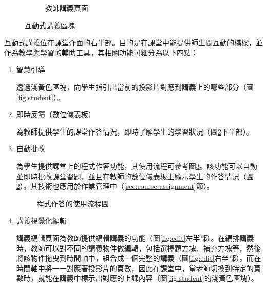\begin{figure}[H]
\begin{subfigure}{0.5\linewidth}
    \caption{教師講義頁面}
    \label{fig:teacher}
  \end{subfigure}
  \caption{互動式講義區塊}
\end{figure}

互動式講義位在課堂介面的右半部。目的是在課堂中能提供師生間互動的橋樑，並作為教學與學習的輔助工具。其相關功能可細分為以下四點：

\begin{enumerate}
  \setlength{\parindent}{2em}

  \item 智慧引導
  \par 透過淺黃色區塊，向學生指引出當前的投影片對應到講義上的哪些部分（圖\ref{fig:student}）。
  
  \item 即時反饋（數位儀表板）
  \par 為教師提供學生的課堂作答情況，即時了解學生的學習狀況（圖\ref{fig:teacher}下半部）。

  \item 自動批改
  \par 為學生提供課堂上的程式作答功能，其使用流程可參考圖\ref{fig:problem-flowchart}。該功能可以自動並即時批改課堂習題，並且在教師的數位儀表板上顯示學生的作答情況（圖\ref{fig:teacher}）。其技術也應用於作業管理中（\ref{sec:course-assignment}節）。
  
  \begin{figure}[H]
    \centering
    \caption{程式作答的使用流程圖}
    \label{fig:problem-flowchart}
  \end{figure}

  \item 講義視覺化編輯
  \par 講義編輯頁面為教師提供編輯講義的功能（圖\ref{fig:edit}左半部）。在編排講義時，教師可以對不同的講義物件做編輯，包括選擇題方塊、補充方塊等，然後將該物件拖曳到時間軸中，組合成一個完整的講義（圖\ref{fig:edit}右半部）。而在時間軸中將一一對應著投影片的頁數，因此在課堂中，當老師切換到特定的頁數時，就能在講義中標示出對應的上課內容（圖\ref{fig:student}的淺黃色區塊）。


\end{enumerate}
